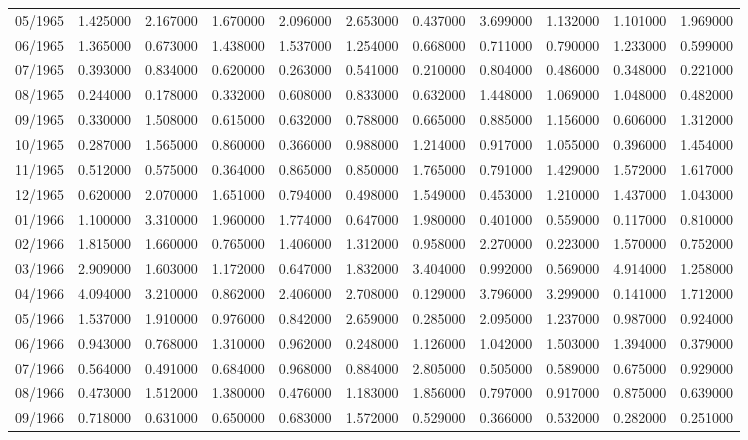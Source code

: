 \begin{tabular}{lrrrrrrrrrr}
05/1965 & 1.425000 & 2.167000 & 1.670000 & 2.096000 & 2.653000 & 0.437000 & 3.699000 & 1.132000 & 1.101000 & 1.969000 \\
06/1965 & 1.365000 & 0.673000 & 1.438000 & 1.537000 & 1.254000 & 0.668000 & 0.711000 & 0.790000 & 1.233000 & 0.599000 \\
07/1965 & 0.393000 & 0.834000 & 0.620000 & 0.263000 & 0.541000 & 0.210000 & 0.804000 & 0.486000 & 0.348000 & 0.221000 \\
08/1965 & 0.244000 & 0.178000 & 0.332000 & 0.608000 & 0.833000 & 0.632000 & 1.448000 & 1.069000 & 1.048000 & 0.482000 \\
09/1965 & 0.330000 & 1.508000 & 0.615000 & 0.632000 & 0.788000 & 0.665000 & 0.885000 & 1.156000 & 0.606000 & 1.312000 \\
10/1965 & 0.287000 & 1.565000 & 0.860000 & 0.366000 & 0.988000 & 1.214000 & 0.917000 & 1.055000 & 0.396000 & 1.454000 \\
11/1965 & 0.512000 & 0.575000 & 0.364000 & 0.865000 & 0.850000 & 1.765000 & 0.791000 & 1.429000 & 1.572000 & 1.617000 \\
12/1965 & 0.620000 & 2.070000 & 1.651000 & 0.794000 & 0.498000 & 1.549000 & 0.453000 & 1.210000 & 1.437000 & 1.043000 \\
01/1966 & 1.100000 & 3.310000 & 1.960000 & 1.774000 & 0.647000 & 1.980000 & 0.401000 & 0.559000 & 0.117000 & 0.810000 \\
02/1966 & 1.815000 & 1.660000 & 0.765000 & 1.406000 & 1.312000 & 0.958000 & 2.270000 & 0.223000 & 1.570000 & 0.752000 \\
03/1966 & 2.909000 & 1.603000 & 1.172000 & 0.647000 & 1.832000 & 3.404000 & 0.992000 & 0.569000 & 4.914000 & 1.258000 \\
04/1966 & 4.094000 & 3.210000 & 0.862000 & 2.406000 & 2.708000 & 0.129000 & 3.796000 & 3.299000 & 0.141000 & 1.712000 \\
05/1966 & 1.537000 & 1.910000 & 0.976000 & 0.842000 & 2.659000 & 0.285000 & 2.095000 & 1.237000 & 0.987000 & 0.924000 \\
06/1966 & 0.943000 & 0.768000 & 1.310000 & 0.962000 & 0.248000 & 1.126000 & 1.042000 & 1.503000 & 1.394000 & 0.379000 \\
07/1966 & 0.564000 & 0.491000 & 0.684000 & 0.968000 & 0.884000 & 2.805000 & 0.505000 & 0.589000 & 0.675000 & 0.929000 \\
08/1966 & 0.473000 & 1.512000 & 1.380000 & 0.476000 & 1.183000 & 1.856000 & 0.797000 & 0.917000 & 0.875000 & 0.639000 \\
09/1966 & 0.718000 & 0.631000 & 0.650000 & 0.683000 & 1.572000 & 0.529000 & 0.366000 & 0.532000 & 0.282000 & 0.251000 \\

\end{tabular}
